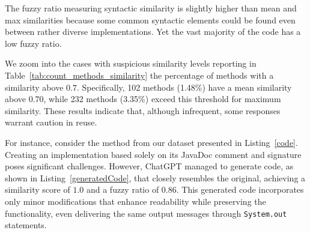 The fuzzy ratio measuring syntactic similarity is slightly higher than mean and max similarities because some common syntactic elements could be found even between rather diverse implementations. Yet the vast majority of the code has a low fuzzy ratio.%

We zoom into the cases with suspicious similarity levels reporting in Table~\ref{tab:count_methods_similarity} the percentage of methods with a similarity above $0.7$. Specifically, 102 methods (1.48\%) have a mean similarity above 0.70, while 232 methods (3.35\%) exceed this threshold for maximum similarity. These results indicate that, although infrequent, some responses warrant caution in reuse. 

For instance, consider the method from our dataset presented in Listing~\ref{code}. Creating an implementation based solely on its JavaDoc comment and signature poses significant challenges. However, ChatGPT managed to generate code, as shown in Listing~\ref{generatedCode}, that closely resembles the original, achieving a similarity score of $1.0$ and a fuzzy ratio of $0.86$. This generated code incorporates only minor modifications that enhance readability while preserving the functionality, even delivering the same output messages through \texttt{System.out} statements.


\noindent {}



